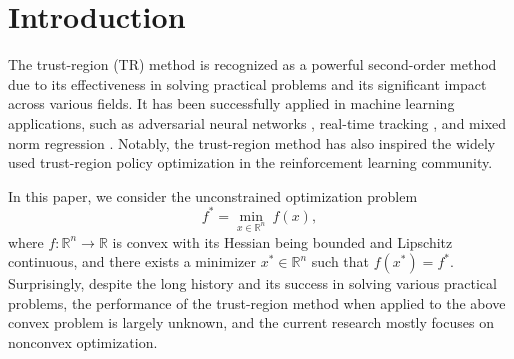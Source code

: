 \documentclass{article}
\begin{document}
\begin{abstract}
    Trust-region-type methods are popular schemes in machine learning due to their excellent practical performance. As accelerating classic algorithms is a fundamental issue in optimization as well as in machine learning, people may wonder if there remains some room for trust-region-type methods to improve. However, the ball-constrained subproblems pose significant obstacles to complexity analysis, making it a daunting task to devise acceleration schemes.
    In this paper, we show for the first time that trust-region-type methods can be accelerated both theoretically and numerically for convex optimization.
    In theory, we prove that our accelerated method has an improved global iteration complexity of $O(\epsilon^{-1/3})$. Numerically, our experiments demonstrate that the proposed algorithm achieves performance comparable to Nesterov's accelerated cubic Newton method, while consistently outperforming non-accelerated trust-region-type methods and the cubic Newton method.
\end{abstract}
\section{Introduction}
\label{Intro}
The trust-region (TR) method \cite{More1983,conn2000trust} is recognized as a powerful second-order method due to its effectiveness in solving practical problems and its significant impact across various fields. It has been successfully applied in machine learning applications, such as adversarial neural networks \cite{yao2019trust}, real-time tracking \cite{liu2004real}, and mixed norm regression \cite{kim2010scalable}. Notably, the trust-region method has also inspired the widely used trust-region policy optimization \cite{schulman2015trust, kurutach2018model} in the reinforcement learning community.

In this paper, we consider the unconstrained optimization problem \begin{equation} \label{eq.main problem} f^* = \min_{x\in \mathbb{R}^n}~ f(x), \end{equation} where $f:\mathbb{R}^n\to \mathbb{R}$ is convex with its Hessian being bounded and Lipschitz continuous, and there exists a minimizer $x^* \in \mathbb{R}^n$ such that $f(x^*)=f^*$. 
Surprisingly, despite the long history and its success in solving various practical problems, the performance of the trust-region method when applied to the above convex problem is largely unknown, and the current research mostly focuses on nonconvex optimization. 
\end{document}
